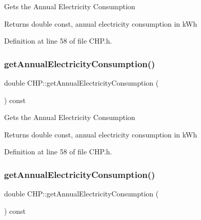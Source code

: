 Gets the Annual Electricity Consumption

\begin{DoxyReturn}{Returns}
double const, annual electricity consumption in k\+Wh 
\end{DoxyReturn}


Definition at line 58 of file C\+H\+P.\+h.

\mbox{\label{class_c_h_p_a37d544d03c45668a9dc5d502cdcb6137}} 
\subsubsection{\texorpdfstring{get\+Annual\+Electricity\+Consumption()}{getAnnualElectricityConsumption()}\hspace{0.1cm}{\footnotesize\ttfamily [2/3]}}
{\footnotesize\ttfamily double C\+H\+P\+::get\+Annual\+Electricity\+Consumption (\begin{DoxyParamCaption}{ }\end{DoxyParamCaption}) const\hspace{0.3cm}{\ttfamily [inline]}}

Gets the Annual Electricity Consumption

\begin{DoxyReturn}{Returns}
double const, annual electricity consumption in k\+Wh 
\end{DoxyReturn}


Definition at line 58 of file C\+H\+P.\+h.

\mbox{\label{class_c_h_p_a37d544d03c45668a9dc5d502cdcb6137}} 
\subsubsection{\texorpdfstring{get\+Annual\+Electricity\+Consumption()}{getAnnualElectricityConsumption()}\hspace{0.1cm}{\footnotesize\ttfamily [3/3]}}
{\footnotesize\ttfamily double C\+H\+P\+::get\+Annual\+Electricity\+Consumption (\begin{DoxyParamCaption}{ }\end{DoxyParamCaption}) const\hspace{0.3cm}{\ttfamily [inline]}}

